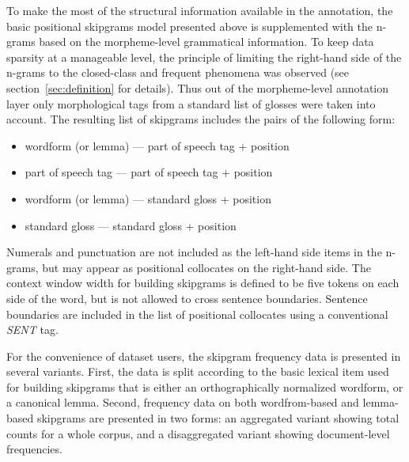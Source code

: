 \documentclass[12pt]{article}
\begin{document}
To make the most of the structural information available in the
annotation, the basic positional skipgrams model presented above is
supplemented with the n-grams based on the morpheme-level grammatical
information. To keep data sparsity at a manageable level, the principle
of limiting the right-hand side of the n-grams to the closed-class and
frequent phenomena was observed (see section~\ref{sec:definition} for
details). Thus out of the morpheme-level annotation layer only
morphological tags from a standard list of glosses were taken into
account. The resulting list of skipgrams includes the pairs of the
following form:
\begin{itemize}
\item wordform (or lemma) — part of speech tag + position
\item part of speech tag — part of speech tag + position
\item wordform (or lemma) — standard gloss + position
\item standard gloss — standard gloss + position
\end{itemize}
Numerals and punctuation are not included as the left-hand side items
in the n-grams, but may appear as positional collocates on the
right-hand side.  The context window width for building skipgrams is
defined to be five tokens on each side of the word, but is not allowed
to cross sentence boundaries. Sentence boundaries are included in the
list of positional collocates using a conventional \textit{SENT} tag.

For the convenience of dataset users, the skipgram frequency data
is presented in several variants. First, the data is split
according to the basic lexical item used for building skipgrams that
is either an orthographically normalized wordform, or a canonical
lemma. Second, frequency data on both wordfrom-based and lemma-based
skipgrams are presented in two forms: an aggregated variant showing
total counts for a whole corpus, and a disaggregated variant showing
document-level frequencies. 
\end{document}
